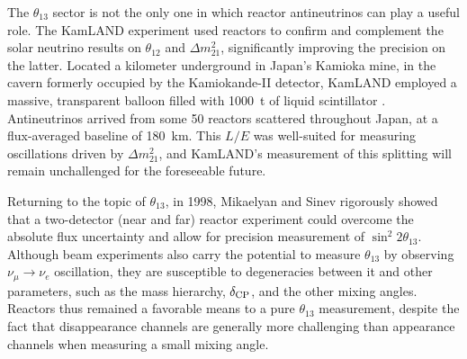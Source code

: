 \documentclass[../thesis.tex]{subfiles}
\begin{document}
The $\theta_{13}$ sector is not the only one in which reactor antineutrinos can play a useful role. The KamLAND experiment used reactors to confirm and complement the solar neutrino results on $\theta_{12}$ and $\Delta m^2_{21}$, significantly improving the precision on the latter. Located a kilometer underground in Japan's Kamioka mine, in the cavern formerly occupied by the Kamiokande-II detector, KamLAND employed a massive, transparent balloon filled with 1000~t of liquid scintillator \cite{PhysRevLett.90.021802}. Antineutrinos arrived from some 50 reactors scattered throughout Japan, at a flux-averaged baseline of 180~km. This $L/E$ was well-suited for measuring oscillations driven by $\Delta m^2_{21}$, and KamLAND's measurement of this splitting will remain unchallenged for the foreseeable future.

Returning to the topic of $\theta_{13}$, in 1998, Mikaelyan and Sinev \cite{Mikaelyan:1998yg} rigorously showed that a two-detector (near and far) reactor experiment could overcome the absolute flux uncertainty and allow for precision measurement of $\sin^2 2\theta_{13}$. Although beam experiments also carry the potential to measure $\theta_{13}$ by observing $\nu_\mu \to \nu_e$ oscillation, they are susceptible to degeneracies between it and other parameters, such as the mass hierarchy, $\delta_\text{CP}$, and the other mixing angles. Reactors thus remained a favorable means to a pure $\theta_{13}$ measurement, despite the fact that disappearance channels are generally more challenging than appearance channels when measuring a small mixing angle.
\end{document}
